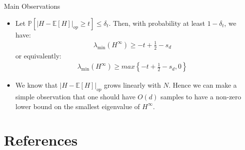\documentclass[serif, aspectratio=169]{beamer}
\begin{document}
\begin{frame}{Main Observations}
	\begin{itemize}
		\item 	Let \( \mathbb{P} \left[ \lvert H - \mathbb{E}[H] \rvert_{op} \geq t \right] \leq \delta_t \). Then, with probability at least \( 1 - \delta_t \), we have:
		\begin{align*}
			\lambda_{\min}(H^\infty) \geq -t + \frac{1}{2} - s_d
		\end{align*}
		or equivalently:
		\begin{align*}
			\lambda_{\min}(H^\infty) \geq max \left\{ -t + \frac{1}{2} - s_d, 0 \right\}
		\end{align*}
		\item We know that \( \lvert H - \mathbb{E}[H] \rvert_{op} \) grows linearly with \( N \). Hence we can make a simple observation that one should have $O(d)$ samples to have a non-zero lower bound on the smallest eigenvalue of \(H^\infty\).
	\end{itemize}


	
\end{frame}



%	



\section{References}
\end{document}
